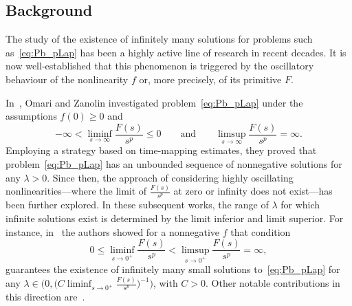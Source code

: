\documentclass[10pt,twoside,english,reqno,a4paper]{amsart}
\theoremstyle{plain}
\theoremstyle{plain}
\theoremstyle{definition}
\theoremstyle{remark}
\numberwithin{equation}{section}
\begin{document}
\subsection{Background}

The study of the existence of infinitely many solutions for problems such as~\eqref{eq:Pb_pLap} has been a highly active line of research in recent decades. It is now well-established that this phenomenon is triggered by the oscillatory behaviour of the nonlinearity $f$ or, more precisely, of its primitive $F$.

In~\cite{OZ96}, Omari and Zanolin investigated problem~\eqref{eq:Pb_pLap} under the assumptions $f(0)\geq 0$ and
\begin{equation}
\label{eq:Intro_OZ}
-\infty<\liminf_{s\to \infty} \frac{F(s)}{s^p} \leq 0 \qquad \text{and} \qquad \limsup_{s\to \infty} \frac{F(s)}{s^p} = \infty.
\end{equation}
Employing a strategy based on time-mapping estimates, they proved that problem~\eqref{eq:Pb_pLap} has an unbounded sequence of nonnegative solutions for any $\lambda>0$. Since then, the approach of considering highly oscillating nonlinearities---where the limit of $\frac{F(s)}{s^p}$ at zero or infinity does not exist---has been further explored. In these subsequent works, the range of $\lambda$ for which infinite solutions exist is determined by the limit inferior and limit superior. For instance, in~\cite{BMR12} the authors showed for a nonnegative $f$ that condition
\begin{equation}
\label{eq:Intro_OZ2}
0\leq \liminf_{s\to 0^+} \frac{F(s)}{s^p}  < \limsup_{s\to 0^+} \frac{F(s)}{s^p} = \infty,
\end{equation}
guarantees the existence of infinitely many small solutions to~\eqref{eq:Pb_pLap} for any $\lambda\in \big(0, \big(C\liminf_{s\to 0^+} \frac{F(s)}{s^p}\big)^{-1}\big)$, with $C>0$. Other notable contributions in this direction are~\cite{BM10, OO06}.
\end{document}
